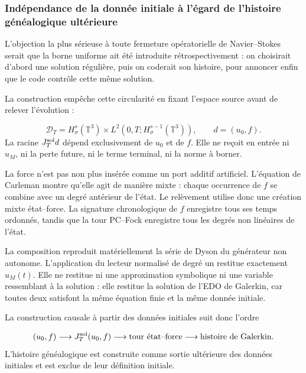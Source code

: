 \subsubsection{Indépendance de la donnée initiale à l’égard de l’histoire généalogique ultérieure}
L’objection la plus sérieuse à toute fermeture opératorielle de Navier–Stokes serait que la borne uniforme ait été introduite rétrospectivement : on choisirait d’abord une solution régulière, puis on coderait son histoire, pour annoncer enfin que le code contrôle cette même solution.\par
La construction empêche cette circularité en fixant l’espace source avant de relever l’évolution :\par
\[
\mathcal D_T
=
H^s_\sigma(\mathbb T^3)
\times
L^2(0,T;H^{s-1}_\sigma(\mathbb T^3)),
\qquad
d=(u_0,f).
\]
La racine \(J_T^{\rm sol}d\) dépend exclusivement de \(u_0\) et de \(f\). Elle ne reçoit en entrée ni \(u_M\), ni la perte future, ni le terme terminal, ni la norme à borner.\par
La force n’est pas non plus insérée comme un port additif artificiel. L’équation de Carleman montre qu’elle agit de manière mixte : chaque occurrence de \(f\) se combine avec un degré antérieur de l’état. Le relèvement utilise donc une création mixte état–force. La signature chronologique de \(f\) enregistre tous ses temps ordonnés, tandis que la tour PC–Fock enregistre tous les degrés non linéaires de l’état.\par
La composition reproduit matériellement la série de Dyson du générateur non autonome. L’application du lecteur normalisé de degré un restitue exactement \(u_M(t)\). Elle ne restitue ni une approximation symbolique ni une variable ressemblant à la solution : elle restitue la solution de l’EDO de Galerkin, car toutes deux satisfont la même équation finie et la même donnée initiale.\par
La construction causale à partir des données initiales suit donc l’ordre\par
\[
(u_0,f)
\longrightarrow
J_T^{\rm sol}(u_0,f)
\longrightarrow
\text{tour état–force}
\longrightarrow
\text{histoire de Galerkin}.
\]
L’histoire généalogique est construite comme sortie ultérieure des données initiales et est exclue de leur définition initiale.\par
{}
